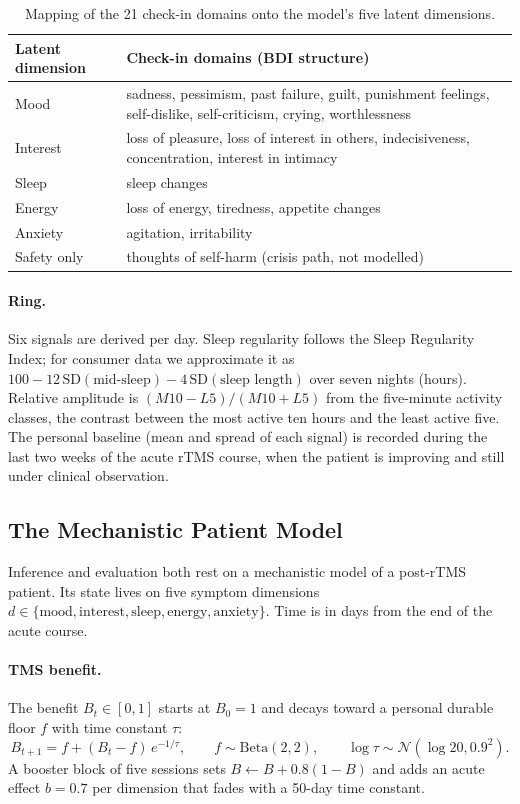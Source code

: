 \documentclass[11pt,a4paper]{article}
\begin{document}
\begin{table}[h]
\centering\small
\begin{tabular}{@{}lp{11cm}@{}}
\toprule
Latent dimension & Check-in domains (BDI structure) \\
\midrule
Mood & sadness, pessimism, past failure, guilt, punishment feelings, self-dislike, self-criticism, crying, worthlessness \\
Interest & loss of pleasure, loss of interest in others, indecisiveness, concentration, interest in intimacy \\
Sleep & sleep changes \\
Energy & loss of energy, tiredness, appetite changes \\
Anxiety & agitation, irritability \\
Safety only & thoughts of self-harm (crisis path, not modelled) \\
\bottomrule
\end{tabular}
\caption{Mapping of the 21 check-in domains onto the model's five latent dimensions.}
\label{tab:items}
\end{table}

\paragraph{Ring.} Six signals are derived per day. Sleep regularity follows the Sleep Regularity Index; for consumer data we approximate it as $100 - 12\,\mathrm{SD}(\text{mid-sleep}) - 4\,\mathrm{SD}(\text{sleep length})$ over seven nights (hours). Relative amplitude is $(M10-L5)/(M10+L5)$ from the five-minute activity classes, the contrast between the most active ten hours and the least active five. The personal baseline (mean and spread of each signal) is recorded during the last two weeks of the acute rTMS course, when the patient is improving and still under clinical observation.

\subsection{The Mechanistic Patient Model}

Inference and evaluation both rest on a mechanistic model of a post-rTMS patient. Its state lives on five symptom dimensions $d \in \{\text{mood}, \text{interest}, \text{sleep}, \text{energy}, \text{anxiety}\}$. Time is in days from the end of the acute course.

\paragraph{TMS benefit.} The benefit $B_t \in [0,1]$ starts at $B_0 = 1$ and decays toward a personal durable floor $f$ with time constant $\tau$:
\begin{equation}
B_{t+1} = f + (B_t - f)\, e^{-1/\tau}, \qquad f \sim \mathrm{Beta}(2,2), \qquad \log\tau \sim \mathcal{N}(\log 20, 0.9^2).
\end{equation}
A booster block of five sessions sets $B \leftarrow B + 0.8(1-B)$ and adds an acute effect $b=0.7$ per dimension that fades with a 50-day time constant.
\end{document}
